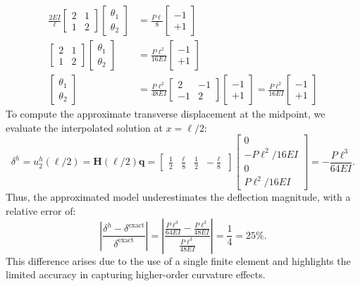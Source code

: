 \documentclass[12pt]{article}
\begin{document}
\begin{align*}
    \frac{2EI}{\ell}\begin{bmatrix}
                        2 & 1 \\
                        1 & 2
                    \end{bmatrix}
    \begin{bmatrix}
        \theta_1 \\ \theta_2
    \end{bmatrix}
     & =
    \frac{P\ell}{8} \begin{bmatrix} -1 \\ +1 \end{bmatrix} \\
    \begin{bmatrix}
        2 & 1 \\
        1 & 2
    \end{bmatrix}
    \begin{bmatrix}
        \theta_1 \\ \theta_2
    \end{bmatrix}
     & =
    \frac{P\ell^2}{16EI}
    \begin{bmatrix}
        -1 \\ +1
    \end{bmatrix}                                         \\
    \begin{bmatrix}
        \theta_1 \\ \theta_2
    \end{bmatrix}
     & =
    \frac{P\ell^2}{48EI}
    \begin{bmatrix}
        2  & -1 \\
        -1 & 2
    \end{bmatrix}
    \begin{bmatrix}
          -1 \\ +1
    \end{bmatrix}
    =
    \frac{P\ell^2}{16EI}
    \begin{bmatrix}
       -1 \\ +1
    \end{bmatrix}
\end{align*}
To compute the approximate transverse displacement at the midpoint, we evaluate the interpolated solution at \( x = \ell/2 \):
$$\delta^h=u_2^h(\ell/2)=\mathbf H(\ell/2)\mathbf q= \begin{bmatrix} \tfrac{1}{2} & \tfrac{\ell}{8} & \tfrac{1}{2} & -\tfrac{\ell}{8} \end{bmatrix} \begin{bmatrix} 0 \\  -P\ell^2/16EI \\  0\\ P\ell^2/16EI \end{bmatrix}=-\frac{P \ell^3}{64 EI}.$$
Thus, the approximated model underestimates the deflection magnitude, with a relative error of:
\[
    \left| \frac{\delta^h - \delta^\text{exact}}{\delta^\text{exact}} \right|
    = \left| \frac{\frac{P \ell^3}{64 EI} - \frac{P \ell^3}{48 EI}}{\frac{P \ell^3}{48 EI}} \right| = \frac{1}{4} = 25\%.
\]
This difference arises due to the use of a single finite element and highlights the limited accuracy in capturing higher-order curvature effects.
\end{document}
